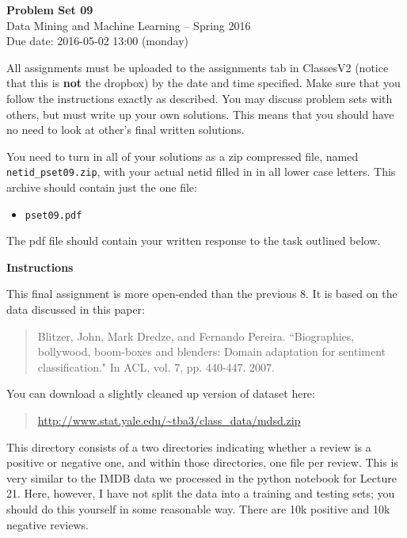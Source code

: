 \documentclass[12pt]{article}
\begin{document}
\begin{center}
{\bf Problem Set 09} \\
Data Mining and Machine Learning -- Spring 2016 \\
Due date: 2016-05-02 13:00 (monday)
\end{center}

\medskip

All assignments must be uploaded to the assignments tab in ClassesV2
(notice that this is \textbf{not} the dropbox) by the date and time specified.
Make sure that you follow the instructions exactly as described.
You may discuss problem sets with others, but must write up your own
solutions. This means that you should have no need to look at other's
final written solutions.

You need to turn in all of your solutions as a zip compressed file, named
\texttt{netid\_pset09.zip}, with your actual netid filled in in all lower
case letters. This archive should contain just the one file:
\begin{itemize}
\item \texttt{pset09.pdf}
\end{itemize}
The pdf file should contain your written response to the task outlined below.

\medskip

\textbf{Instructions}

This final assignment is more open-ended than the previous 8. It is based on the
data discussed in this paper:
\begin{quote}
Blitzer, John, Mark Dredze, and Fernando Pereira. ``Biographies, bollywood,
boom-boxes and blenders: Domain adaptation for sentiment classification."
In ACL, vol. 7, pp. 440-447. 2007.
\end{quote}
You can download a slightly cleaned up version of dataset here:
\begin{quote}
\url{http://www.stat.yale.edu/~tba3/class_data/mdsd.zip}
\end{quote}
This directory consists of a two directories indicating whether a review is
a positive or negative one, and within those directories, one file per review.
This is very similar to the IMDB data we processed in
the python notebook for Lecture 21. Here, however, I have not split the data into
a training and testing sets; you should do this yourself in some reasonable way.
There are 10k positive and 10k negative reviews.
\end{document}
